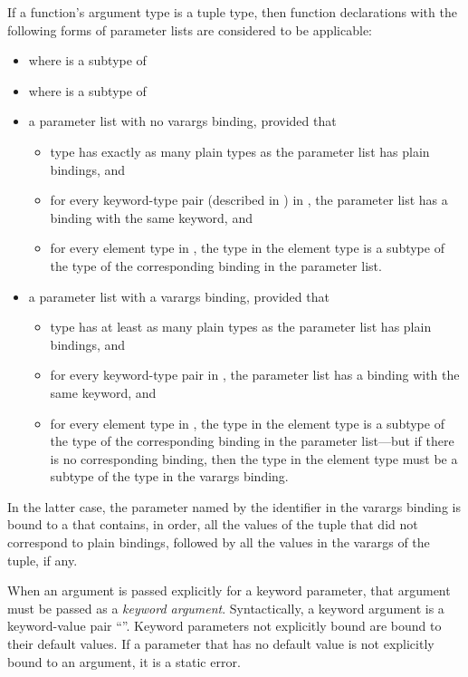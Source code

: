 If a function's argument type  is
a tuple type, then function declarations with the following forms of
parameter lists are considered to be applicable:
\begin{itemize}
\item
               where  is a subtype of 
\item
         where  is a subtype of 
\item
a parameter list with no varargs binding, provided that
 \begin{itemize}
 \item type  has exactly as many plain types as the parameter
list has plain bindings, and
 \item for every keyword-type pair (described in
) in , the parameter list has a
binding with the same keyword, and
 \item for every element type in , the type in the element type
is a subtype of the type of the corresponding binding in the parameter list.
 \end{itemize}
\item
a parameter list with a varargs binding, provided that
 \begin{itemize}
 \item type  has at least as many plain types as the parameter
list has plain bindings, and
 \item for every keyword-type pair in
, the parameter list has a binding with the same keyword, and
 \item for every element type in , the type in the element type
is a subtype of the type of the corresponding binding in the parameter
list---but if there is no corresponding binding, then the type in the
element type must be a subtype of the type in the varargs binding.
 \end{itemize}
\end{itemize}
    In the latter case, the parameter named by the identifier in the varargs
    binding is bound to a 
    that contains, in order, all the
 values of the tuple that did not correspond to plain
    bindings, followed by all the values in the varargs 
    of the tuple, if any.

When an argument is passed explicitly for a keyword parameter, that
argument must be passed as a \emph{keyword argument}.
Syntactically, a keyword argument is a keyword-value pair
``''.
Keyword parameters not explicitly bound are bound to their default values.
If a parameter that has no default value is not explicitly bound to an
argument, it is a static error.

